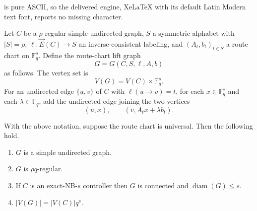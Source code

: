 \documentclass[10pt,a4paper]{amsart}
\providecommand{\tightlist}{\setlength{\itemsep}{0pt}\setlength{\parskip}{0pt}}
\begin{document}
is pure ASCII, so the delivered engine, XeLaTeX with its default Latin Modern text font, reports no missing character.
\begin{definition}\label{def:lift}
Let \(C\) be a \(\rho\)-regular simple
undirected graph, \(S\) a symmetric alphabet with \(|S|=\rho\),
\(\ell:\overrightarrow E(C)\to S\) an inverse-consistent labeling, and
\((A_t,b_t)_{t\in S}\) a route chart on \(\mathbb F_q^s\). Define the
route-chart lift graph \[
  G=G(C,S,\ell,A,b)
\] as follows. The vertex set is \[
  V(G)=V(C)\times\mathbb F_q^s .
\] For an undirected edge \(\{u,v\}\) of \(C\) with \(\ell(u\to v)=t\),
for each \(x\in\mathbb F_q^s\) and each \(\lambda\in\mathbb F_q\), add
the undirected edge joining the two vertices \[
  (u,x),\qquad (v,A_tx+\lambda b_t) .
\]
\end{definition}

\begin{lemma}\label{lem:lift}
With the above notation, suppose the route chart is
universal. Then the following hold.

\begin{enumerate}
\def\labelenumi{\arabic{enumi}.}
\tightlist
\item
  \(G\) is a simple undirected graph.
\item
  \(G\) is \(\rho q\)-regular.
\item
  If \(C\) is an exact-NB-\(s\) controller then \(G\) is connected and
  \(\operatorname{diam}(G)\le s\).
\item
  \(|V(G)|=|V(C)|q^s\).
\end{enumerate}
\end{lemma}
\end{document}
